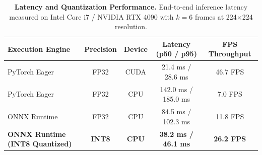 \begin{table}[t]
\centering
\caption{\textbf{Latency and Quantization Performance.} End-to-end inference latency measured on Intel Core i7 / NVIDIA RTX 4090 with $k=6$ frames at 224$\times$224 resolution.}
\label{tab:latency_quantization}
\begin{tabular}{lcccc}
\toprule
\textbf{Execution Engine} & \textbf{Precision} & \textbf{Device} & \textbf{Latency (p50 / p95)} & \textbf{FPS Throughput} \\
\midrule
PyTorch Eager & FP32 & CUDA & 21.4 ms / 28.6 ms & 46.7 FPS \\
PyTorch Eager & FP32 & CPU & 142.0 ms / 185.0 ms & 7.0 FPS \\
ONNX Runtime & FP32 & CPU & 84.5 ms / 102.3 ms & 11.8 FPS \\
\textbf{ONNX Runtime (INT8 Quantized)} & \textbf{INT8} & \textbf{CPU} & \textbf{38.2 ms / 46.1 ms} & \textbf{26.2 FPS} \\
\bottomrule
\end{tabular}
\end{table}
